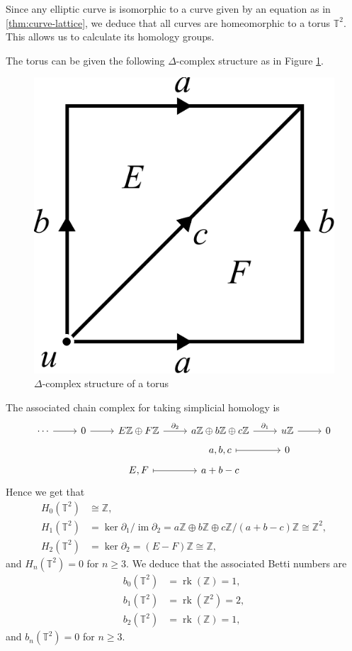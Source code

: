\documentclass{article}
\theoremstyle{definition}
\theoremstyle{remark}
\newcommand{\Z}{\mathbb{Z}}
\newcommand{\T}{\mathbb{T}}
\newcommand{\im}{\operatorname{im}}
\newcommand{\rk}{\operatorname{rk}}
\begin{document}
Since any elliptic curve is isomorphic to a curve given by an equation as in
\ref{thm:curve-lattice}, we deduce that all curves are homeomorphic
to a torus $\T^2$. This allows us to calculate its homology groups.

The torus can be given the following $\Delta$-complex structure
as in Figure \ref{fig:torus-delta}.
\begin{figure}[h]
	\centering 
	\includegraphics[width=0.4\columnwidth]{torus-delta.pdf}
	\caption[torus-delta]{$\Delta$-complex structure of a torus}
	\label{fig:torus-delta}
\end{figure}

The associated chain complex for taking simplicial homology is 
\begin{equation*}
	\begin{tikzcd}[row sep=tiny]
	\cdots & 0 & {E\Z \oplus F\Z} & {a\Z\oplus b\Z\oplus c\Z} & u\Z & 0 \\
	&&& {a,b,c} & 0 \\
	&& {E,F} & {a +b-c}
	\arrow["\partial_1", from=1-4, to=1-5]
	\arrow["\partial_2", from=1-3, to=1-4]
	\arrow[from=1-5, to=1-6]
	\arrow[from=1-2, to=1-3]
	\arrow[from=1-1, to=1-2]
	\arrow[maps to, from=3-3, to=3-4]
	\arrow[maps to, from=2-4, to=2-5]
\end{tikzcd}
\end{equation*}
Hence we get that
\begin{align*}
	H_0(\T^2) &\cong \Z,\\
	H_1(\T^2) &= \ker \partial_1 / \im \partial_2
	= a\Z \oplus b\Z \oplus c\Z / (a + b - c)\Z \cong \Z^2,\\
	H_2(\T^2) &= \ker \partial_2 = (E-F)\Z \cong \Z,
\end{align*}
and $H_n(\T^2) = 0$ for $n \geq 3$.
We deduce that the associated Betti numbers are
\begin{align*}
	b_0(\T^2) &= \rk(\Z) = 1,\\
	b_1(\T^2) &= \rk(\Z^2) = 2,\\
	b_2(\T^2) &= \rk(\Z) = 1,
\end{align*}
and $b_n(\T^2) = 0$ for $n \geq 3$.
\end{document}
